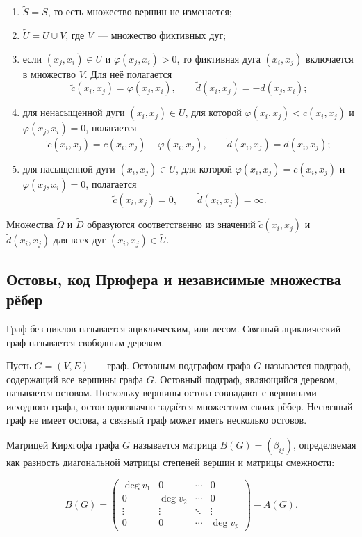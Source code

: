 \begin{enumerate}
    \item $\widetilde S=S$, то есть множество вершин не изменяется;

    \item $\widetilde U=U\cup V$, где $V$~--- множество фиктивных дуг;

    \item если $(x_j,x_i)\in U$ и $\varphi(x_j,x_i)>0$, то фиктивная дуга $(x_i,x_j)$ включается в множество $V$. Для неё полагается
    \[
    \widetilde c(x_i,x_j)=\varphi(x_j,x_i),
    \qquad
    \widetilde d(x_i,x_j)=-d(x_j,x_i);
    \]

    \item для ненасыщенной дуги $(x_i,x_j)\in U$, для которой $\varphi(x_i,x_j)<c(x_i,x_j)$ и $\varphi(x_j,x_i)=0$, полагается
    \[
    \widetilde c(x_i,x_j)=c(x_i,x_j)-\varphi(x_i,x_j),
    \qquad
    \widetilde d(x_i,x_j)=d(x_i,x_j);
    \]

    \item для насыщенной дуги $(x_i,x_j)\in U$, для которой $\varphi(x_i,x_j)=c(x_i,x_j)$ и $\varphi(x_j,x_i)=0$, полагается
    \[
    \widetilde c(x_i,x_j)=0,
    \qquad
    \widetilde d(x_i,x_j)=\infty.
    \]
\end{enumerate}

Множества $\widetilde\Omega$ и $\widetilde D$ образуются соответственно из значений $\widetilde c(x_i,x_j)$ и $\widetilde d(x_i,x_j)$ для всех дуг $(x_i,x_j)\in\widetilde U$.

\subsection{Остовы, код Прюфера и независимые множества рёбер}

Граф без циклов называется ациклическим, или лесом. Связный ациклический граф называется свободным деревом.

Пусть $G = (V, E)$~--- граф. Остовным подграфом графа $G$ называется подграф, содержащий все вершины графа $G$. Остовный подграф, являющийся деревом, называется остовом. Поскольку вершины остова совпадают с вершинами исходного графа, остов однозначно задаётся множеством своих рёбер. Несвязный граф не имеет остова, а связный граф может иметь несколько остовов.

Матрицей Кирхгофа графа $G$ называется матрица $B(G)=(\beta_{ij})$, определяемая как разность диагональной матрицы степеней вершин и матрицы смежности:

\[
B(G)=
\begin{pmatrix}
\deg v_1 & 0 & \cdots & 0 \\
0 & \deg v_2 & \cdots & 0 \\
\vdots & \vdots & \ddots & \vdots \\
0 & 0 & \cdots & \deg v_p
\end{pmatrix}
-A(G).
\]

